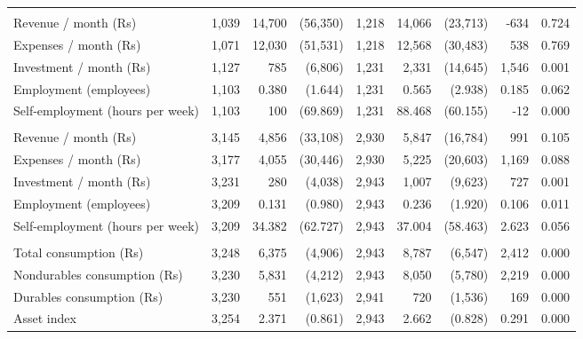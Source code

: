 \documentclass{report}
\begin{document}
\begin{table}[H]
{\begin{tabular}{lrrrrrrrr}
\addlinespace[0.3em]
\multicolumn{9}{l}{\textbf{Businesses}}\\
\hspace{1em}Revenue / month (Rs) & 1,039 & 14,700 & (56,350) & 1,218 & 14,066 & (23,713) & -634 & 0.724\\
\hspace{1em}Expenses / month (Rs) & 1,071 & 12,030 & (51,531) & 1,218 & 12,568 & (30,483) & 538 & 0.769\\
\hspace{1em}Investment / month (Rs) & 1,127 & 785 & (6,806) & 1,231 & 2,331 & (14,645) & 1,546 & 0.001\\
\hspace{1em}Employment (employees) & 1,103 & 0.380 & (1.644) & 1,231 & 0.565 & (2.938) & 0.185 & 0.062\\
\hspace{1em}Self-employment (hours per week) & 1,103 & 100 & (69.869) & 1,231 & 88.468 & (60.155) & -12 & 0.000\\
\addlinespace[0.3em]
\multicolumn{9}{l}{\textbf{Businesses (all households)}}\\
\hspace{1em}Revenue / month (Rs) & 3,145 & 4,856 & (33,108) & 2,930 & 5,847 & (16,784) & 991 & 0.105\\
\hspace{1em}Expenses / month (Rs) & 3,177 & 4,055 & (30,446) & 2,930 & 5,225 & (20,603) & 1,169 & 0.088\\
\hspace{1em}Investment / month (Rs) & 3,231 & 280 & (4,038) & 2,943 & 1,007 & (9,623) & 727 & 0.001\\
\hspace{1em}Employment (employees) & 3,209 & 0.131 & (0.980) & 2,943 & 0.236 & (1.920) & 0.106 & 0.011\\
\hspace{1em}Self-employment (hours per week) & 3,209 & 34.382 & (62.727) & 2,943 & 37.004 & (58.463) & 2.623 & 0.056\\
\addlinespace[0.3em]
\multicolumn{9}{l}{\textbf{Consumption (per household per month)}}\\
\hspace{1em}Total consumption (Rs) & 3,248 & 6,375 & (4,906) & 2,943 & 8,787 & (6,547) & 2,412 & 0.000\\
\hspace{1em}Nondurables consumption (Rs) & 3,230 & 5,831 & (4,212) & 2,943 & 8,050 & (5,780) & 2,219 & 0.000\\
\hspace{1em}Durables consumption (Rs) & 3,230 & 551 & (1,623) & 2,941 & 720 & (1,536) & 169 & 0.000\\
\hspace{1em}Asset index & 3,254 & 2.371 & (0.861) & 2,943 & 2.662 & (0.828) & 0.291 & 0.000\\
\bottomrule
\end{tabular}}
\end{table}
\end{document}
